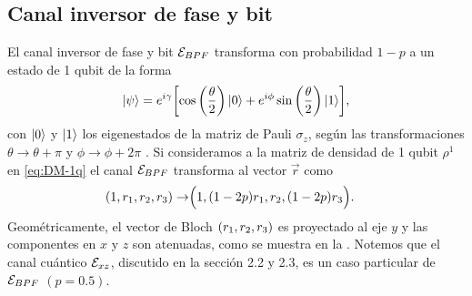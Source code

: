 \subsection{Canal inversor de fase y bit} %
El canal inversor de fase y bit $\mathcal{E}_{BPF}$ transforma 
con probabilidad $1-p$ a un estado de 1 qubit de la forma  
\begin{align}
   \ket{\psi}=e^{i\gamma}\qty[\cos\qty(\frac{\theta}{2})\ket{0}
  +e^{i\phi}\sin \qty(\frac{\theta}{2})\ket{1}],
   \label{eq:psi-1qubit}
 \end{align} 
con $\ket{0}$ y $\ket{1}$ los eigenestados de 
la matriz de Pauli $\sigma_z$, según las transformaciones 
$\theta\to\theta+\pi$ y $\phi\to\phi+2\pi$ 
\cite{nielsen_chuang_2011}. 
Si consideramos a la matriz de densidad de 1 qubit
$\rho^1$ en \eqref{eq:DM-1q} el canal $\mathcal{E}_{BPF}$ 
transforma  al vector $\vec{r}$ como \cite{nielsen_chuang_2011}
\begin{align}
\qty(1,r_1,r_2,r_3)\rightarrow&\Big(1,\qty(1-2p)r_1,r_2,\qty(1-2p)r_3\Big).
\label{eq:bit-phase-flip-Bloch-trans}
\end{align}
Geométricamente, el vector de Bloch $\qty(r_1,r_2,r_3)$ es 
proyectado al eje $y$  y las componentes 
en $x$ y $z$ son atenuadas, como se muestra en la 
.
Notemos que el canal cuántico $\mathcal{E}_{xz}$, discutido 
en la sección 2.2 y 2.3, es un caso particular de $\mathcal{E}_{BPF}$ $(p=0.5)$.

